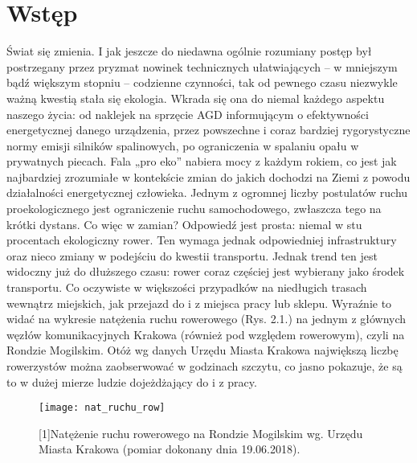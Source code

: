 \chapter{Wstęp}
\label{cha:wstep}
Świat się zmienia. I jak jeszcze do niedawna ogólnie rozumiany postęp był postrzegany przez pryzmat nowinek technicznych ułatwiających – w mniejszym bądź większym stopniu – codzienne czynności, tak od pewnego czasu niezwykle ważną kwestią stała się ekologia. Wkrada się ona do niemal każdego aspektu naszego życia: od naklejek na sprzęcie AGD informującym o efektywności energetycznej danego urządzenia, przez powszechne i coraz bardziej rygorystyczne normy emisji silników spalinowych, po ograniczenia w spalaniu opału w prywatnych piecach. Fala „pro eko” nabiera mocy z każdym rokiem, co jest jak najbardziej zrozumiałe w kontekście zmian do jakich dochodzi na Ziemi z powodu działalności energetycznej człowieka. Jednym z ogromnej liczby postulatów ruchu proekologicznego jest ograniczenie ruchu samochodowego, zwłaszcza tego na krótki dystans. Co więc w zamian? Odpowiedź jest prosta: niemal w stu procentach ekologiczny rower. Ten wymaga jednak odpowiedniej infrastruktury oraz nieco zmiany w podejściu do kwestii transportu. \newline
Jednak trend ten jest widoczny już do dłuższego czasu: rower coraz częściej jest wybierany jako środek transportu. Co oczywiste w większości przypadków na niedługich trasach wewnątrz miejskich, jak przejazd do i z miejsca pracy lub sklepu. Wyraźnie to widać na wykresie natężenia ruchu rowerowego (Rys. 2.1.)  na jednym z głównych węzłów komunikacyjnych Krakowa (również pod względem rowerowym), czyli na Rondzie Mogilskim. Otóż wg danych Urzędu Miasta Krakowa największą liczbę rowerzystów można zaobserwować w godzinach szczytu, co jasno pokazuje, że są to w dużej mierze ludzie dojeżdżający do i z pracy.
\begin{figure}[H]
\centering
\texttt{[image: nat\_ruchu\_row]}
\caption{[1]Natężenie ruchu rowerowego na Rondzie Mogilskim wg. Urzędu Miasta Krakowa (pomiar dokonany dnia 19.06.2018).}
\end{figure}
